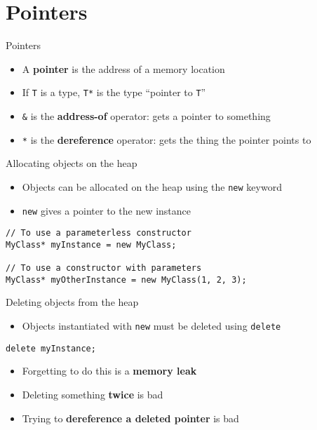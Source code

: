 \part{Pointers}
\frame{\partpage}

\begin{frame}[fragile]{Pointers}
    \begin{itemize}
        \item A \textbf{pointer} is the address of a memory location
        \item If \lstinline{T} is a type, \lstinline{T*} is the type ``pointer to \lstinline{T}''
        \item \lstinline{&} is the \textbf{address-of} operator: gets a pointer to something
        \item \lstinline{*} is the \textbf{dereference} operator: gets the thing the pointer points to
    \end{itemize}
\end{frame}

\begin{frame}[fragile]{Allocating objects on the heap}
    \begin{itemize}
        \item Objects can be allocated on the heap using the \lstinline{new} keyword
        \item \lstinline{new} gives a pointer to the new instance
    \end{itemize}
    \begin{lstlisting}
// To use a parameterless constructor
MyClass* myInstance = new MyClass;

// To use a constructor with parameters
MyClass* myOtherInstance = new MyClass(1, 2, 3);
    \end{lstlisting}
\end{frame}

\begin{frame}[fragile]{Deleting objects from the heap}
    \begin{itemize}
        \item Objects instantiated with \lstinline{new} must be deleted using \lstinline{delete}
    \end{itemize}
    \begin{lstlisting}
delete myInstance;
    \end{lstlisting}
    \begin{itemize}
        \item Forgetting to do this is a \textbf{memory leak}
        \item Deleting something \textbf{twice} is bad
        \item Trying to \textbf{dereference a deleted pointer} is bad
    \end{itemize}
\end{frame}

